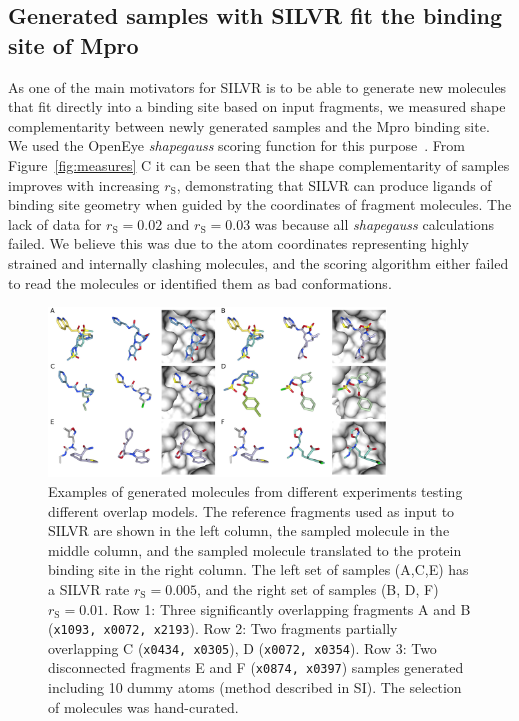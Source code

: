 \documentclass[journal=jacsat,manuscript=article]{achemso}
\begin{document}
\subsection{Generated samples with SILVR fit the binding site of Mpro}
As one of the main motivators for SILVR is to be able to generate new molecules that fit directly into a binding site based on input fragments, we measured shape complementarity between newly generated samples and the Mpro binding site. We used the OpenEye \textit{shapegauss} scoring function for this purpose~\cite{kelley2015posit}. From Figure~\ref{fig:measures} C it can be seen that the shape complementarity of samples improves with increasing $r_{\mathrm{S}}$, demonstrating that SILVR can produce ligands of binding site geometry when guided by the coordinates of fragment molecules. The lack of data for $r_{\mathrm{S}}=0.02$ and $r_{\mathrm{S}}=0.03$ was because all \textit{shapegauss} calculations failed. We believe this was due to the atom coordinates representing highly strained and internally clashing molecules, and the scoring algorithm either failed to read the molecules or identified them as bad conformations.

\begin{figure}[!ht]
    \centering
    \includegraphics[width=0.8\textwidth]{paper/Figures/Fig4/fig_4_ref_sample_bound.png}
    \caption{Examples of generated molecules from different experiments testing different overlap models. The reference fragments used as input to SILVR  are shown in the left column, the sampled molecule in the middle column, and the sampled molecule translated to the protein binding site in the right column. The left set of samples (A,C,E) has a SILVR rate $r_{\mathrm{S}}=0.005$, and the right set of samples (B, D, F) $r_{\mathrm{S}}=0.01$. Row 1: Three significantly overlapping fragments A and B (\texttt{x1093, x0072, x2193}). Row 2: Two fragments partially overlapping C (\texttt{x0434, x0305}), D (\texttt{x0072, x0354}). Row 3: Two disconnected fragments E and F (\texttt{x0874, x0397}) samples generated including 10 dummy atoms (method described in SI). The selection of molecules was hand-curated.}
    \label{fig:samples}
\end{figure}
\end{document}
